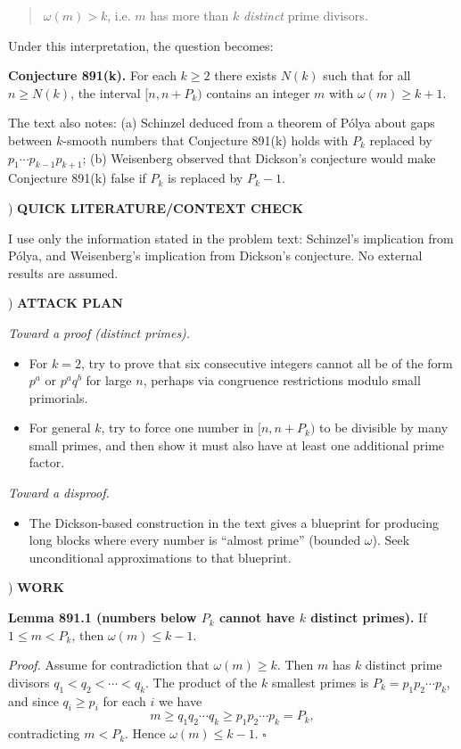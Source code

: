 \begin{quote}
$\omega(m)>k$, i.e. $m$ has more than $k$ \emph{distinct} prime divisors.
\end{quote}

\noindent Under this interpretation, the question becomes:

\noindent \textbf{Conjecture 891(k).} For each $k\ge 2$ there exists $N(k)$ such that for all $n\ge N(k)$, the interval $[n,n+P_k)$ contains an integer $m$ with $\omega(m)\ge k+1$.

\noindent The text also notes: (a) Schinzel deduced from a theorem of P\'olya about gaps between $k$-smooth numbers that Conjecture 891(k) holds with $P_k$ replaced by $p_1\cdots p_{k-1}p_{k+1}$; (b) Weisenberg observed that Dickson's conjecture would make Conjecture 891(k) false if $P_k$ is replaced by $P_k-1$.

) \textbf{QUICK LITERATURE/CONTEXT CHECK}

\noindent I use only the information stated in the problem text: Schinzel's implication from P\'olya, and Weisenberg's implication from Dickson's conjecture. No external results are assumed.

) \textbf{ATTACK PLAN}

\noindent \emph{Toward a proof (distinct primes).}
\begin{itemize}
\item For $k=2$, try to prove that six consecutive integers cannot all be of the form $p^a$ or $p^a q^b$ for large $n$, perhaps via congruence restrictions modulo small primorials.
\item For general $k$, try to force one number in $[n,n+P_k)$ to be divisible by many small primes, and then show it must also have at least one additional prime factor.
\end{itemize}
\noindent \emph{Toward a disproof.}
\begin{itemize}
\item The Dickson-based construction in the text gives a blueprint for producing long blocks where every number is ``almost prime'' (bounded $\omega$). Seek unconditional approximations to that blueprint.
\end{itemize}

) \textbf{WORK}

\noindent \textbf{Lemma 891.1 (numbers below $P_k$ cannot have $k$ distinct primes).}
If $1\le m < P_k$, then $\omega(m)\le k-1$.

\noindent \emph{Proof.}
Assume for contradiction that $\omega(m)\ge k$. Then $m$ has $k$ distinct prime divisors $q_1<q_2<\cdots<q_k$. The product of the $k$ smallest primes is $P_k=p_1p_2\cdots p_k$, and since $q_i\ge p_i$ for each $i$ we have
\[
 m \ge q_1q_2\cdots q_k \ge p_1p_2\cdots p_k = P_k,
\]
contradicting $m<P_k$. Hence $\omega(m)\le k-1$.
\hfill$\square$

